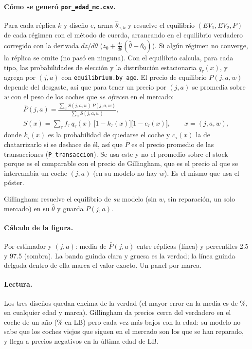 \documentclass{article}
\newcommand{\archivo}[1]{\path{#1}}
\begin{document}
\paragraph{Cómo se generó \texttt{por\_edad\_mc.csv}.} Para cada réplica $k$ y diseño $e$,
\archivo{por_edad_mc.py} arma $\hat\theta_{e,k}$ y resuelve el equilibrio $(EV_1,EV_2,P)$ de cada
régimen con el método de cuerda, arrancando en el equilibrio verdadero corregido con la derivada
$dz/d\theta$ ($z_0+\tfrac{dz}{d\theta}(\hat\theta-\theta_0)$). Si algún régimen no converge, la
réplica se omite (no pasó en ninguna). Con el equilibrio calcula, para cada tipo, las probabilidades
de elección y la distribución estacionaria $q_\tau(x)$, y agrega por $(j,a)$ con
\texttt{equilibrium.by\_age}. El precio de equilibrio $P(j,a,w)$ depende del desgaste, así que para tener
un precio por $(j,a)$ se promedia sobre $w$ con el peso de los coches que \emph{se ofrecen} en el mercado:
\begin{gather*}
\bar P(j,a)=\frac{\sum_w S(j,a,w)\,P(j,a,w)}{\sum_w S(j,a,w)},\\
S(x)=\sum_\tau f_\tau\,q_\tau(x)\,\big[1-k_\tau(x)\big]\big[1-c_\tau(x)\big],\qquad x=(j,a,w),
\end{gather*}
donde $k_\tau(x)$ es la probabilidad de quedarse el coche y $c_\tau(x)$ la de chatarrizarlo si se deshace de él,
así que $\bar P$ es el precio promedio de las transacciones (\texttt{P\_transaccion}). Se usa este y no el
promedio sobre el stock porque es el comparable con el precio de Gillingham, que es el precio al que se
intercambia un coche $(j,a)$ (en su modelo no hay $w$). Es el mismo que usa el póster.

Gillingham: \archivo{gillingham/por_edad_mc.py} resuelve el equilibrio de \emph{su} modelo
(sin $w$, sin reparación, un solo mercado) en su $\hat\theta$ y guarda $P(j,a)$.

\paragraph{Cálculo de la figura.} Por estimador y $(j,a)$: media de $\bar P(j,a)$ entre réplicas
(línea) y percentiles 2.5 y 97.5 (sombra). La banda guinda clara y gruesa es la verdad; la línea guinda delgada
dentro de ella marca el valor exacto. Un panel por marca.

\paragraph{Lectura.} Los tres diseños quedan encima de la verdad (el mayor error en la media es de
\ErrPrecioD\%, en cualquier edad y marca). Gillingham da precios cerca del verdadero en el coche de un
año (\ErrPrecioGillJoven\% en LB) pero cada vez más bajos con la edad: su modelo no sabe que los
coches viejos que siguen en el mercado son los que se han reparado, y llega a precios negativos en la
última edad de LB.
\end{document}
